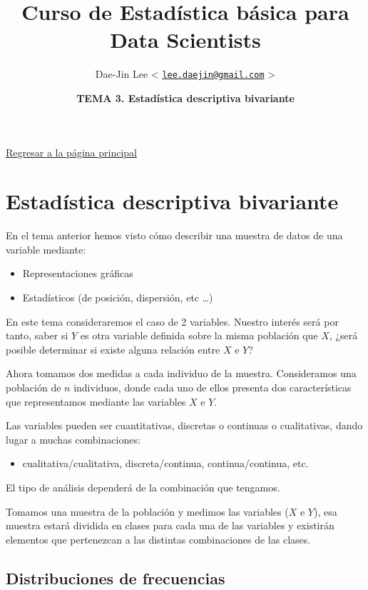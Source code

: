 \documentclass[]{article}
\title{\textbf{Curso de Estadística básica para Data Scientists}}
\author{Dae-Jin Lee \textless{}
\href{mailto:lee.daejin@gmail.com}{\nolinkurl{lee.daejin@gmail.com}}
\textgreater{}}
\date{\textbf{TEMA 3. Estadística descriptiva bivariante}}
\def\tightlist{}
\numberwithin{equation}{section}
\begin{document}
\maketitle

{
\hypersetup{linkcolor=black}
\setcounter{tocdepth}{2}
\tableofcontents
}
\newpage

\href{https://idaejin.github.io/bcam-courses/R/datahack/}{Regresar a la
página principal}

\section{Estadística descriptiva
bivariante}\label{estadistica-descriptiva-bivariante}

En el tema anterior hemos visto cómo describir una muestra de datos de
una variable mediante:

\begin{itemize}
\tightlist
\item
  Representaciones gráficas
\item
  Estadísticos (de posición, dispersión, etc \ldots{})
\end{itemize}

En este tema consideraremos el caso de 2 variables. Nuestro interés será
por tanto, saber si \(Y\) es otra variable definida sobre la misma
población que \(X\), ¿será posible determinar si existe alguna relación
entre \(X\) e \(Y\)?

Ahora tomamos dos medidas a cada individuo de la muestra. Consideramos
una población de \(n\) individuos, donde cada uno de ellos presenta dos
características que representamos mediante las variables \(X\) e \(Y\).

Las variables pueden ser cuantitativas, discretas o continuas o
cualitativas, dando lugar a muchas combinaciones:

\begin{itemize}
\tightlist
\item
  cualitativa/cualitativa, discreta/continua, continua/continua, etc.
\end{itemize}

El tipo de análisis dependerá de la combinación que tengamos.

Tomamos una muestra de la población y medimos las variables (\(X\) e
\(Y\)), esa muestra estará dividida en clases para cada una de las
variables y existirán elementos que pertenezcan a las distintas
combinaciones de las clases.

\subsection{Distribuciones de
frecuencias}\label{distribuciones-de-frecuencias}
\end{document}
